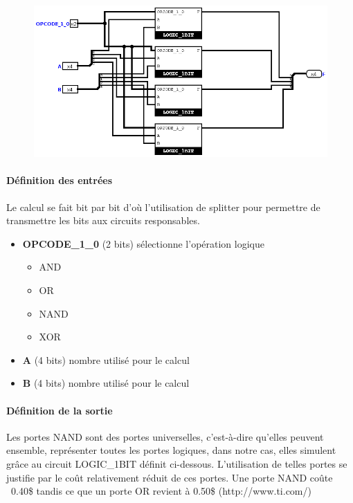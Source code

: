 \documentclass[a4paper]{article}
\begin{document}
\begin{tcolorbox}[colframe=Monokaimagenta,colback=white]

\begin{figure}[H]
    \centering
    \includegraphics[width=\textwidth]{src/LOGIC_4BITS.png}
    \label{fig:LOGIQUE}
\end{figure}


\paragraph{Définition des entrées}
Le calcul se fait bit par bit d'où l'utilisation de splitter pour permettre de transmettre les bits aux circuits responsables.

    \begin{itemize}
    \item     \textbf{OPCODE\_1\_0} (2 bits) sélectionne l'opération logique
    \begin{itemize}
        \item     AND
        \item     OR
        \item     NAND
        \item     XOR
    \end{itemize}
    
    \item \textbf{A} (4 bits) nombre utilisé pour le calcul 
    \item \textbf{B} (4 bits) nombre utilisé pour le calcul 
    \end{itemize}
\paragraph{Définition de la sortie}


    
Les portes NAND sont des portes universelles, c'est-à-dire qu'elles peuvent ensemble, représenter toutes les portes logiques, dans notre cas, elles simulent grâce au circuit LOGIC\_1BIT définit ci-dessous. 
L'utilisation de telles portes se justifie par le coût relativement réduit de ces portes. Une porte NAND coûte ~0.40\$ tandis ce que un porte OR revient à 0.50\$ (http://www.ti.com/)


\end{tcolorbox}
\end{document}
